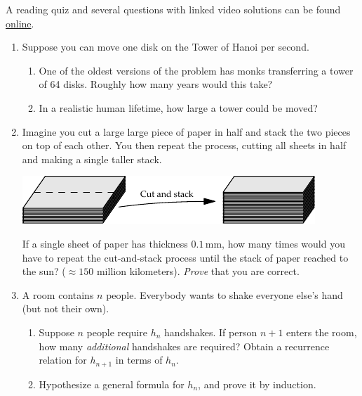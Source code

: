 \begin{exercises}{}{}
	A reading quiz and several questions with linked video solutions can be found \href{http://www.math.uci.edu/~ndonalds/math13/selftest/5-1-induction.html}{online}.

	\begin{enumerate}
	  \item Suppose you can move one disk on the Tower of Hanoi per second.
	  \begin{enumerate}
	    \item One of the oldest versions of the problem has monks transferring a tower of 64 disks. Roughly how many years would this take?
	    \item In a realistic human lifetime, how large a tower could be moved?
	  \end{enumerate}
	  
	  
	  \item Imagine you cut a large large piece of paper in half and stack the two pieces on top of each other. You then repeat the process, cutting all sheets in half and making a single taller stack.
		\begin{center}
			\includegraphics{induction-02-paper}
		\end{center}
		If a single sheet of paper has thickness $0.1$\,mm, how many times would you have to repeat the cut-and-stack process until the stack of paper reached to the sun? ($\approx 150$ million kilometers). \emph{Prove} that you are correct.
	  
	
	  \item A room contains $n$ people. Everybody wants to shake everyone else's hand (but not their own).
	  \begin{enumerate}
	    \item Suppose $n$ people require $h_n$ handshakes. If person $n+1$ enters the room, how many \emph{additional} handshakes are required? Obtain a recurrence relation for $h_{n+1}$ in terms of $h_n$.
	    \item Hypothesize a general formula for $h_n$, and prove it by induction.
	  \end{enumerate}
	  

\end{enumerate}
\end{exercises}
